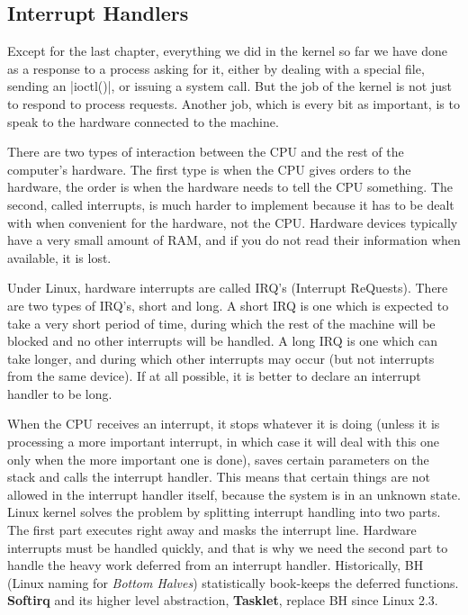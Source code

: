 \documentclass[10pt, oneside]{book}
\begin{document}
\subsection{Interrupt Handlers}
\label{sec:irq}
Except for the last chapter, everything we did in the kernel so far we have done as a response to a process asking for it, either by dealing with a special file, sending an \cpp|ioctl()|, or issuing a system call.
But the job of the kernel is not just to respond to process requests.
Another job, which is every bit as important, is to speak to the hardware connected to the machine.

There are two types of interaction between the CPU and the rest of the computer's hardware.
The first type is when the CPU gives orders to the hardware, the order is when the hardware needs to tell the CPU something.
The second, called interrupts, is much harder to implement because it has to be dealt with when convenient for the hardware, not the CPU.
Hardware devices typically have a very small amount of RAM, and if you do not read their information when available, it is lost.

Under Linux, hardware interrupts are called IRQ's (Interrupt ReQuests).
There are two types of IRQ's, short and long.
A short IRQ is one which is expected to take a very short period of time, during which the rest of the machine will be blocked and no other interrupts will be handled.
A long IRQ is one which can take longer, and during which other interrupts may occur (but not interrupts from the same device).
If at all possible, it is better to declare an interrupt handler to be long.

When the CPU receives an interrupt, it stops whatever it is doing (unless it is processing a more important interrupt, in which case it will deal with this one only when the more important one is done),
saves certain parameters on the stack and calls the interrupt handler.
This means that certain things are not allowed in the interrupt handler itself, because the system is in an unknown state.
Linux kernel solves the problem by splitting interrupt handling into two parts.
The first part executes right away and masks the interrupt line.
Hardware interrupts must be handled quickly, and that is why we need the second part to handle the heavy work deferred from an interrupt handler.
Historically, BH (Linux naming for \textit{Bottom Halves}) statistically book-keeps the deferred functions.
\textbf{Softirq} and its higher level abstraction, \textbf{Tasklet}, replace BH since Linux 2.3.
\end{document}

